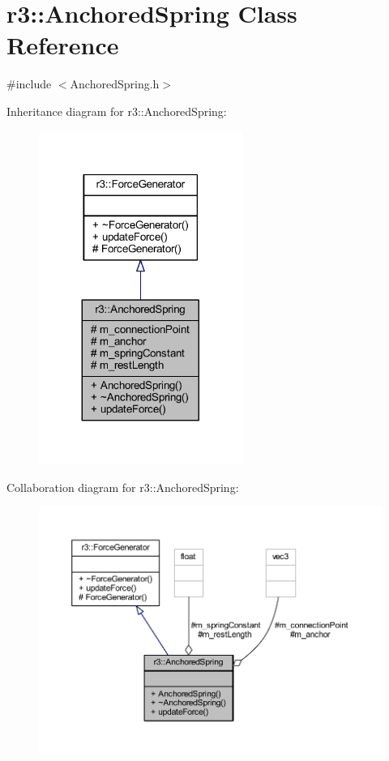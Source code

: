 \hypertarget{classr3_1_1_anchored_spring}{}\section{r3\+:\+:Anchored\+Spring Class Reference}
\label{classr3_1_1_anchored_spring}


{\ttfamily \#include $<$Anchored\+Spring.\+h$>$}



Inheritance diagram for r3\+:\+:Anchored\+Spring\+:\nopagebreak
\begin{figure}[H]
\begin{center}
\leavevmode
\includegraphics[width=188pt]{classr3_1_1_anchored_spring__inherit__graph}
\end{center}
\end{figure}


Collaboration diagram for r3\+:\+:Anchored\+Spring\+:\nopagebreak
\begin{figure}[H]
\begin{center}
\leavevmode
\includegraphics[width=350pt]{classr3_1_1_anchored_spring__coll__graph}
\end{center}
\end{figure}
